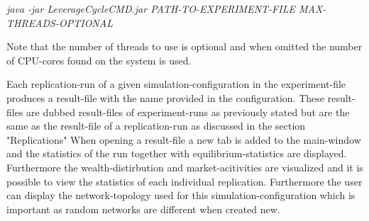 \documentclass[Bachelorarbeit.tex]{subfiles}
\begin{document}
\begin{center}
\textit{java -jar LeverageCycleCMD.jar PATH-TO-EXPERIMENT-FILE MAX-THREADS-OPTIONAL}
\end{center}

Note that the number of threads to use is optional and when omitted the number of CPU-cores found on the system is used. 

\medskip

Each replication-run of a given simulation-configuration in the experiment-file produces a result-file with the name provided in the configuration. These result-files are dubbed result-files of experiment-runs as previously stated but are the same as the result-file of a replication-run as discussed in the section "Replications"
When opening a result-file a new tab is added to the main-window and the statistics of the run together with equilibrium-statistics are displayed. Furthermore the wealth-distirbution and market-acitivities are visualized and it is possible to view the statistics of each individual replication. Furthermore the user can display the network-topology used for this simulation-configuration which is important as random networks are different when created new.
\end{document}
